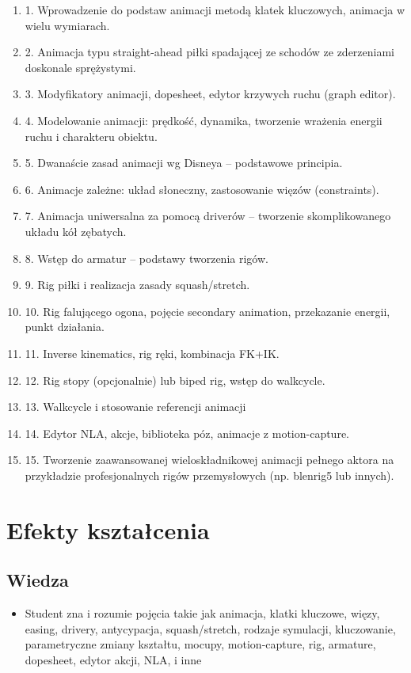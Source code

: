 \documentclass[12pt, a4paper]{article}
\begin{document}
\begin{enumerate}
  \item 1. Wprowadzenie do podstaw animacji metodą klatek kluczowych, animacja w wielu wymiarach.
  \item 2. Animacja typu straight-ahead piłki spadającej ze schodów ze zderzeniami doskonale sprężystymi.
  \item 3. Modyfikatory animacji, dopesheet, edytor krzywych ruchu (graph editor).
  \item 4. Modelowanie animacji: prędkość, dynamika, tworzenie wrażenia energii ruchu i charakteru obiektu.
  \item 5. Dwanaście zasad animacji wg Disneya – podstawowe principia.
  \item 6. Animacje zależne: układ słoneczny, zastosowanie więzów (constraints).
  \item 7. Animacja uniwersalna za pomocą driverów – tworzenie skomplikowanego układu kół zębatych.
  \item 8. Wstęp do armatur – podstawy tworzenia rigów.
  \item 9. Rig piłki i realizacja zasady squash/stretch.
  \item 10. Rig falującego ogona, pojęcie secondary animation, przekazanie energii, punkt działania.
  \item 11. Inverse kinematics, rig ręki, kombinacja FK+IK.
  \item 12. Rig stopy (opcjonalnie) lub biped rig, wstęp do walkcycle.
  \item 13. Walkcycle i stosowanie referencji animacji
  \item 14. Edytor NLA, akcje, biblioteka póz, animacje z motion-capture.
  \item 15. Tworzenie zaawansowanej wieloskładnikowej animacji pełnego aktora na przykładzie profesjonalnych rigów przemysłowych (np. blenrig5 lub innych).
\end{enumerate}

\section{Efekty kształcenia}

\subsection*{Wiedza}
\begin{itemize}
  \item Student zna i rozumie pojęcia takie jak animacja, klatki kluczowe, więzy, easing, drivery, antycypacja, squash/stretch, rodzaje symulacji, kluczowanie, parametryczne zmiany kształtu, mocupy, motion-capture, rig, armature, dopesheet, edytor akcji, NLA, i inne
\end{itemize}
\end{document}

